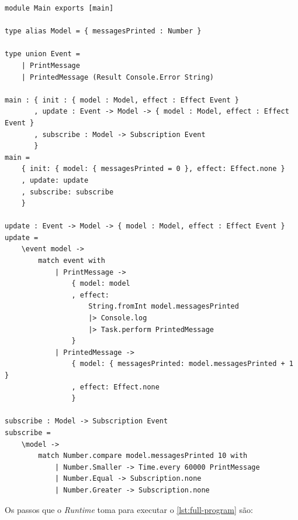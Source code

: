 \begin{lstlisting}[label={lst:full-program},caption={Exemplo de programa completo em Ipe, que imprime na tela uma mensagem a cada minuto}]
module Main exports [main]

type alias Model = { messagesPrinted : Number }

type union Event = 
    | PrintMessage
    | PrintedMessage (Result Console.Error String)

main : { init : { model : Model, effect : Effect Event }
       , update : Event -> Model -> { model : Model, effect : Effect Event }
       , subscribe : Model -> Subscription Event
       }
main =
    { init: { model: { messagesPrinted = 0 }, effect: Effect.none }
    , update: update
    , subscribe: subscribe
    }

update : Event -> Model -> { model : Model, effect : Effect Event }
update =
    \event model ->
        match event with
            | PrintMessage ->
                { model: model
                , effect: 
                    String.fromInt model.messagesPrinted
                    |> Console.log
                    |> Task.perform PrintedMessage
                }
            | PrintedMessage ->
                { model: { messagesPrinted: model.messagesPrinted + 1 }
                , effect: Effect.none
                }

subscribe : Model -> Subscription Event
subscribe =
    \model ->
        match Number.compare model.messagesPrinted 10 with
            | Number.Smaller -> Time.every 60000 PrintMessage
            | Number.Equal -> Subscription.none
            | Number.Greater -> Subscription.none
\end{lstlisting}

Os passos que o \textit{Runtime} toma para executar o \autoref{lst:full-program}
são:

